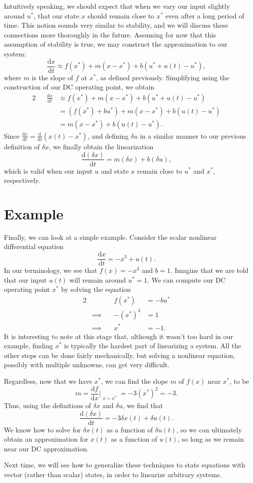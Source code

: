 \documentclass[letterpaper]{article}
\theoremstyle{remark}
\newcommand{\dx}{\mathrm{d}x}
\newcommand{\dt}{\mathrm{d}t}
\newcommand{\diff}{\mathrm{d}}
\newcommand{\df}{\mathrm{d}f}
\newcommand{\eqn}[1]{\begin{alignat*}{2}#1\end{alignat*}}
\newcommand*{\thus}{&\implies\quad&}
\begin{document}
Intuitively speaking, we should expect that when we vary our input slightly around $u^*$, that our state $x$ should remain close to $x^*$ even after a long period of time. This notion sounds very similar to stability, and we will discuss these connections more thoroughly in the future. Assuming for now that this assumption of stability is true, we may construct the approximation to our system:
\[
    \frac{\dx}{\dt} \approx f(x^*) + m(x - x^*) + b(u^* + u(t) - u^*),
\]
where $m$ is the slope of $f$ at $x^*$, as defined previously. Simplifying using the construction of our DC operating point, we obtain
\eqn{
    && \frac{\dx}{\dt} &\approx f(x^*) + m(x - x^*) + b(u^* + u(t) - u^*) \\
    &&&= (f(x^*) + bu^*) + m(x - x^*) + b(u(t) - u^*) \\
    &&&= m(x - x^*) + b(u(t) - u^*).
}
Since $\frac{\dx}{\dt} = \frac{\diff}{\dt}(x(t) - x^*)$, and defining $\delta u$ in a similar manner to our previous definition of $\delta x$, we finally obtain the linearization
\[
    \frac{\diff (\delta x)}{\dt} = m(\delta x) + b(\delta u),
\]
which is valid when our input $u$ and state $x$ remain close to $u^*$ and $x^*$, respectively.

\section{Example}
Finally, we can look at a simple example. Consider the scalar nonlinear differential equation
\[
    \frac{\dx}{\dt} = -x^3 + u(t).
\]
In our terminology, we see that $f(x) = -x^3$ and $b = 1$. Imagine that we are told that our input $u(t)$ will remain around $u^* = 1$. We can compute our DC operating point $x^*$ by solving the equation
\eqn{
    && f(x^*) &= -bu^* \\
    \thus -(x^*)^3 &= 1 \\
    \thus x^* &= -1.
}
It is interesting to note at this stage that, although it wasn't too hard in our example, finding $x^*$ is typically the hardest part of linearizing a system. All the other steps can be done fairly mechanically, but solving a nonlinear equation, possibly with multiple unknowns, can get very difficult.

Regardless, now that we have $x^*$, we can find the slope $m$ of $f(x)$ near $x^*$, to be
\[
    m = \frac{\df}{\dx}\Bigr|_{\substack{x=x^*}} = -3(x^*)^2 = -3.
\]
Thus, using the definitions of $\delta x$ and $\delta u$, we find that
\[
    \frac{\diff (\delta x)}{\dt} = -3\delta x(t) + \delta u(t).
\]
We know how to solve for $\delta x(t)$ as a function of $\delta u(t)$, so we can ultimately obtain an approximation for $x(t)$ as a function of $u(t)$, so long as we remain near our DC approximation.

Next time, we will see how to generalize these techniques to state equations with vector (rather than scalar) states, in order to linearize arbitrary systems.
\end{document}
